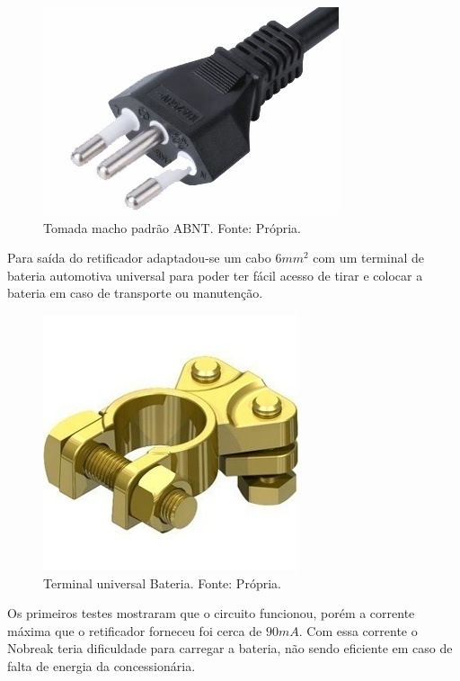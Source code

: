                 \begin{figure}[!htb]
            		\centering
            		\includegraphics[scale= 0.4]{figuras/Pardrao_tomada.jpg}
            		\caption{Tomada macho padrão ABNT. Fonte: Própria.}
            		\label{tomada}
            	\end{figure}	 
            	
				Para saída do retificador adaptadou-se um cabo $6mm^2$ com um terminal de 						bateria automotiva universal para poder ter fácil acesso de tirar e 							colocar a bateria em caso de transporte ou manutenção.  
				
                \begin{figure}[!htb]
            		\centering
            		\includegraphics[scale= 0.4]{figuras/Terminal_Bateria.jpg}
            		\caption{Terminal universal Bateria. Fonte: Própria.}
            		\label{terminal}
            	\end{figure}
            	
            	Os primeiros testes mostraram que o circuito funcionou, porém a corrente 						máxima que o retificador forneceu foi cerca de $90mA$. Com essa corrente o 						Nobreak teria dificuldade para carregar a bateria, não sendo eficiente em caso 				de falta de energia da concessionária. 
            	
